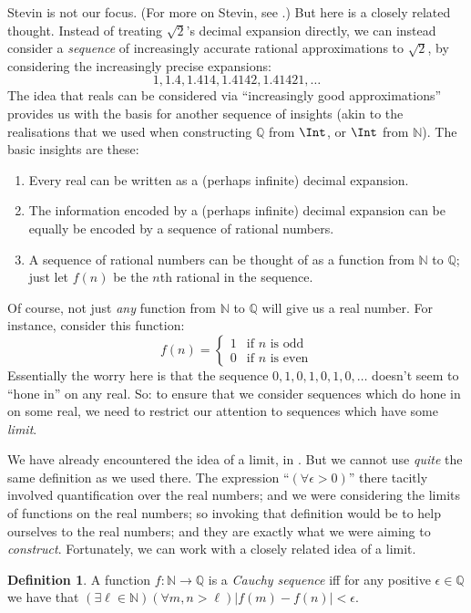 \documentclass[10pt,a4paper]{article}
\makeatletter
\theoremstyle{plain}
\theoremstyle{definition}
\newtheorem{defn}[thm]{Definition}
\theoremstyle{remark}
\newcommand*{\ollabel}[1]{\label{#1}}
\newcommand{\olref}{\@ifnextchar[{\olref@i}{\olref@final}}
\def\olref@i[#1]{\@ifnextchar[{\olref@ii}{\olref@final}}
\def\olref@ii[#1]{\@ifnextchar[{\olref@iii}{\olref@final}}
\def\olref@iii[#1]{\olref@final}
\def\olref@final#1{\ref{#1}}
\providecommand{\Nat}{\ensuremath{\mathbb{N}}}
\providecommand{\Rat}{\mathbb{Q}}
\makeatother
\begin{document}
Stevin is not our focus. (For more on Stevin, see
\citealt{KatzKatz2012}.) But here is a closely related thought.
Instead of treating $\sqrt{2}$'s decimal expansion directly, we can
instead consider a  \emph{sequence} of increasingly accurate rational
approximations to $\sqrt{2}$, by considering the increasingly precise
expansions: 
\[
1, 1.4, 1.414, 1.4142, 1.41421,\ldots
\]
The idea that reals can be considered via ``increasingly good
approximations'' provides us with the basis for another sequence of
insights (akin to the realisations that we used when constructing
$\Rat$ from $\Int$, or $\Int$ from $\Nat$). The basic insights are
these:
\begin{enumerate}
	\item Every real can be written as a (perhaps infinite) decimal
	expansion.
	\item The information encoded by a (perhaps infinite) decimal
	expansion can be equally be encoded by a sequence of rational
	numbers.
	\item A sequence of rational numbers can be thought of as a
	function from $\Nat$ to $\Rat$; just let $f(n)$ be the $n$th
	rational in the sequence.
\end{enumerate}
Of course, not just \emph{any} function from $\Nat$ to $\Rat$ will
give us a real number. For instance, consider this function:
\[
	f(n) =\begin{cases}
			1 & \text{if }n\text{ is odd}\\
			0 &\text{if }n\text{ is even}
		\end{cases}
\]
Essentially the worry here is that the sequence $0,1,0,1,0,1,0,\ldots$
doesn't seem to ``hone in'' on any real. So: to ensure that we
consider sequences which do hone in on some real, we need to restrict
our attention to sequences which have some \emph{limit}. 

We have already encountered the idea of a limit, in
\olref[his][set][limits]{sec}. But we cannot use \emph{quite} the same
definition as we used there. The expression ``$(\forall \epsilon>0)$''
there tacitly involved quantification over the real numbers; and we
were considering the limits of functions on the real numbers; so
invoking that definition would be to help ourselves to the real
numbers; and they are exactly what we were aiming to \emph{construct}.
Fortunately, we can work with a closely related idea of a limit. 
\begin{defn}\ollabel{def:CauchySequence}
  A function $f: \Nat \to \Rat$ is a \emph{Cauchy sequence} iff for
  any positive $\epsilon \in \Rat$ we have that $(\exists \ell \in
  \Nat)(\forall m, n > \ell)|f(m) - f(n)| < \epsilon$.
\end{defn}
\end{document}
